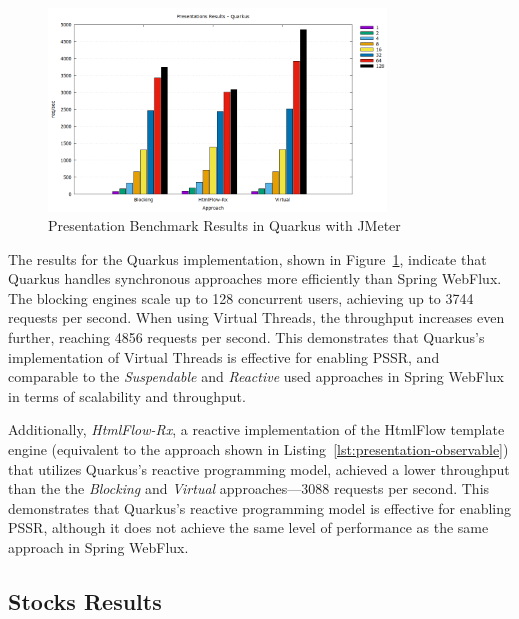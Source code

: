 \begin{figure}[h]
     \centering
     \includegraphics[width=0.8\textwidth]{./Graphs/presentations-quarkus-jmeter.png}
     \caption{Presentation Benchmark Results in Quarkus with JMeter}\label{fig:presentations-quarkus-jmeter}
\end{figure}

The results for the Quarkus implementation, shown in
Figure~\ref{fig:presentations-quarkus-jmeter}, indicate that Quarkus handles
synchronous approaches more efficiently than Spring WebFlux. The blocking
engines scale up to 128 concurrent users, achieving up to 3744 requests per
second. When using Virtual Threads, the throughput increases even further,
reaching 4856 requests per second. This demonstrates that Quarkus's
implementation of Virtual Threads is effective for enabling PSSR\@, and
comparable to the \textit{Suspendable} and \textit{Reactive} used approaches in
Spring WebFlux in terms of scalability and throughput.

Additionally, \textit{HtmlFlow-Rx}, a reactive implementation of the HtmlFlow
template engine (equivalent to the approach shown in
Listing~\ref{lst:presentation-observable}) that utilizes Quarkus's reactive
programming model, achieved a lower throughput than the the \textit{Blocking}
and \textit{Virtual} approaches—3088 requests per second. This demonstrates
that Quarkus's reactive programming model is effective for enabling PSSR\@,
although it does not achieve the same level of performance as the same approach
in Spring WebFlux.

\subsection{Stocks Results}

